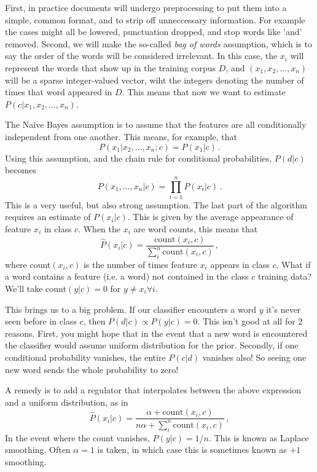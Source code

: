 \documentclass[a4paper,12pt]{article}
\begin{document}
First, in practice documents will undergo preprocessing to put them into a simple, common format, and to strip off unneccessary information. For example the cases might all be lowered, punctuation dropped, and stop words like 'and' removed. Second, we will make the so-called \textit{bag of words} assumption, which is to say the order of the words will be considered irrelevant. In this case, the $x_i$ will represent the words that show up in the training corpus $D$, and $(x_1, x_2, ... , x_n)$ will be a sparse integer-valued vector, wiht the integers denoting the number of times that word appeared in $D$. This means that now we want to estimate $P(c|x_1, x_2, ..., x_n)$. 

The Naive Bayes assumption is to assume that the features are all conditionally independent from one another. This means, for example, that
\begin{equation}
P(x_1 | x_2, ..., x_n; c) = P(x_1|c)\, . 
\end{equation}
Using this assumption, and the chain rule for conditional probabilities, $P(d|c)$ becomes
\begin{equation}
P(x_1, ..., x_n|c) = \prod_{i=1}^n P(x_i |c) \, .
\end{equation}
This is a very useful, but also strong assumption. The last part of the algorithm requires an estimate of $P(x_i|c)$. This is given by the average appearance of feature $x_i$ in class $c$. When the $x_i$ are word counts, this means that
\begin{equation}
\hat{P}(x_i | c) = \frac{\text{count}(x_i, c)}{\sum_i^n \text{count}(x_i, c)} \, ,
\end{equation}
where count$(x_i,c)$ is the number of times feature $x_i$ appears in class $c$. What if a word contains a feature (i.e. a word) not contained in the class $c$ training data? We'll take count$(y|c) =0$ for $y \neq x_i \forall i$.

This brings us to a big problem. If our classifier encounters a word $y$ it's never seen before in class $c$, then $P(d|c) \propto P(y|c) = 0$. This isn't good at all for 2 reasons. First, you might hope that in the event that a new word is encountered the classifier would assume uniform distribution for the prior. Secondly, if one conditional probability vanishes, the entire $P(c|d)$ vanishes also! So seeing one new word sends the whole probability to zero!

A remedy is to add a regulator that interpolates between the above expression and a uniform distribution, as in 
\begin{equation}
\hat{P}(x_i | c) = \frac{\alpha + \text{count}(x_i, c)}{n \alpha + \sum_i^n \text{count}(x_i, c)} \, ,
\end{equation}
In the event where the count vanishes, $\hat{P}(y|c) = 1/n$. This is known as Laplace smoothing. Often $\alpha = 1$ is taken, in which case this is sometimes known as $+1$ smoothing. 
\end{document}
